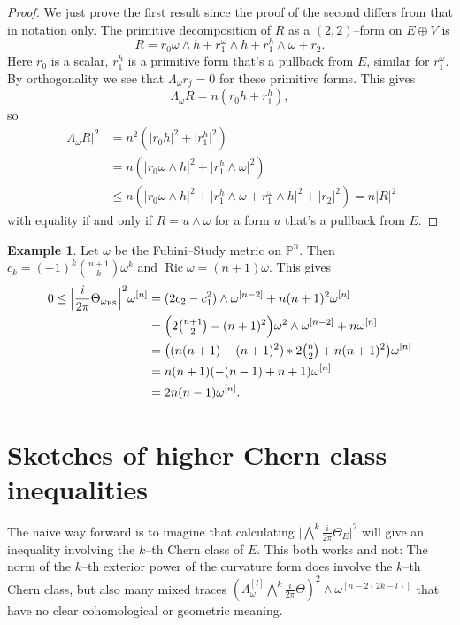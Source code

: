 \documentclass[11pt,a4paper]{amsart}
\def\^#1{^{[#1]}}
\DeclareMathOperator{\Ric}{Ric}
\def\PP{\mathbb{P}}
\def\curv{\frac{i}{2\pi} \Theta}
\theoremstyle{definition}
\newtheorem{exam}[theo]{Example}
\theoremstyle{remark}
\numberwithin{equation}{section}
\begin{document}
\begin{proof}
    We just prove the first result since the proof of the second
differs from that in notation only.  The primitive decomposition of
$R$ as a $(2,2)$--form on $E \oplus V$ is 
$$
R = r_0 \omega \wedge h + r_1^\omega \wedge h + r_1^h \wedge \omega
+ r_2.
$$
Here $r_0$ is a scalar, $r_1^h$ is a primitive form that's a pullback from
$E$, similar for $r_1^\omega$. By orthogonality we see that $\Lambda_\omega
r_j = 0$ for these primitive forms. This gives 
$$
\Lambda_\omega R = n (r_0 h + r_1^h),
$$
so
\begin{align*}
\lvert \Lambda_\omega R \rvert^2 
&= n^2 (\lvert r_0 h\rvert^2 +\lvert r_1^h\rvert^2)
\\
&= n (\lvert r_0 \omega \wedge h\rvert^2 
+ \lvert r_1^h \wedge \omega \rvert^2)
\\
&\leq
n(\lvert r_0 \omega \wedge h \rvert^2 
+ \lvert r_1^h \wedge \omega 
+ r_1^\omega \wedge h \rvert^2 
+ \lvert r_2 \rvert^2 )
= n \lvert R \rvert^2
\end{align*}
with equality if and only if $R = u \wedge \omega$ for a form $u$ that's a pullback from $E$.
\end{proof}


\begin{exam}
Let $\omega$ be the Fubini--Study metric on $\PP^n$.  Then $c_k = (-1)^k
\binom{n+1}{k} \omega^k$ and $\Ric \omega = (n+1)\omega$. This gives
\begin{align*}
    0 \leq
    \Bigl\lvert \curv_{\omega_{\mathrm{FS}}} \Bigr\rvert^2 \omega\^n
    & = (2 c_2 - c_1^2) \wedge \omega\^{n-2} + n(n+1)^2 \omega\^{n}
    \\
    &= \Bigl(2 \tbinom{n+1}{2} - (n+1)^2\Bigr) \omega^2 \wedge \omega\^{n-2}
    + n \omega\^{n}
    \\
    &= \bigl(
    (n(n+1) - (n+1)^2) * 2 \tbinom{n}{2} + n(n+1)^2
    \bigr) \omega\^{n}
    \\    
    &= n(n+1)(-(n-1) + n + 1) \omega\^{n}
    \\
    &= 2n(n-1) \omega\^n.
\end{align*}
\end{exam}



\section{Sketches of higher Chern class inequalities}


The naive way forward is to imagine that calculating $\lvert \bigwedge^k\!
\curv_E \rvert^2$ will give an inequality involving the $k$--th Chern
class of $E$. This both works and not: The norm of the $k$--th exterior
power of the curvature form does involve the $k$--th Chern class, but also
many mixed traces $(\Lambda_\omega\^l \bigwedge^k\!\curv)^2 \wedge
\omega\^{n-2(2k-l)}$ that have no clear cohomological or geometric meaning. 
\end{document}
